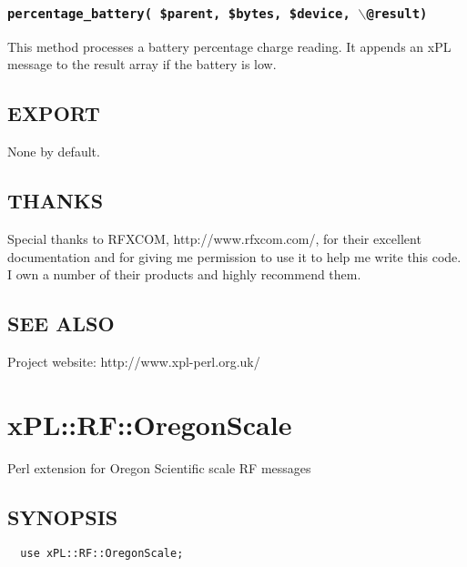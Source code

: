 \subsubsection*{\texttt{percentage\_battery( \$parent, \$bytes, \$device, $\backslash$@result)}\label{xPL::RF::Oregon_percentage_battery_parent_bytes_device_backslash_result_}}


This method processes a battery percentage charge reading.  It appends
an xPL message to the result array if the battery is low.

\subsection*{EXPORT\label{xPL::RF::Oregon_EXPORT}}


None by default.

\subsection*{THANKS\label{xPL::RF::Oregon_THANKS}}


Special thanks to RFXCOM, \textsf{http://www.rfxcom.com/}, for their
excellent documentation and for giving me permission to use it to help
me write this code.  I own a number of their products and highly
recommend them.

\subsection*{SEE ALSO\label{xPL::RF::Oregon_SEE_ALSO}}


Project website: http://www.xpl-perl.org.uk/

\section{xPL::RF::OregonScale\label{xPL::RF::OregonScale}}


Perl extension for Oregon Scientific scale RF messages

\subsection*{SYNOPSIS\label{xPL::RF::OregonScale_SYNOPSIS}}
\begin{verbatim}
  use xPL::RF::OregonScale;
\end{verbatim}
